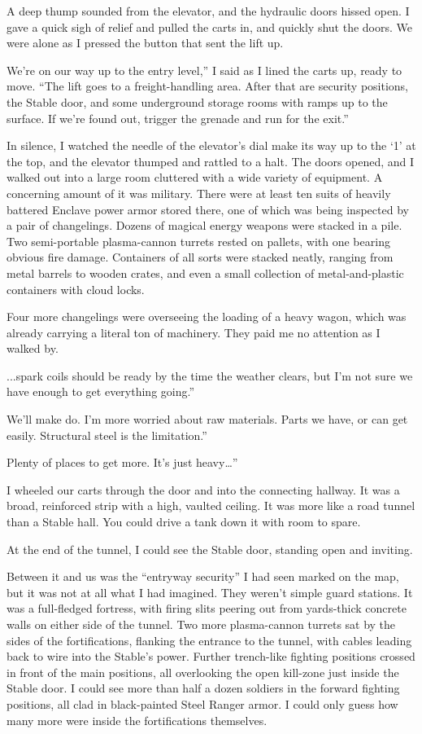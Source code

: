 A deep thump sounded from the elevator, and the hydraulic doors hissed open. I gave a quick sigh of relief and pulled the carts in, and quickly shut the doors. We were alone as I pressed the button that sent the lift up.

\leavevmode{}We’re on our way up to the entry level,” I said as I lined the carts up, ready to move. “The lift goes to a freight-handling area. After that are security positions, the Stable door, and some underground storage rooms with ramps up to the surface. If we’re found out, trigger the grenade and run for the exit.”

In silence, I watched the needle of the elevator’s dial make its way up to the ‘1’ at the top, and the elevator thumped and rattled to a halt. The doors opened, and I walked out into a large room cluttered with a wide variety of equipment. A concerning amount of it was military. There were at least ten suits of heavily battered Enclave power armor stored there, one of which was being inspected by a pair of changelings. Dozens of magical energy weapons were stacked in a pile. Two semi-portable plasma-cannon turrets rested on pallets, with one bearing obvious fire damage. Containers of all sorts were stacked neatly, ranging from metal barrels to wooden crates, and even a small collection of metal-and-plastic containers with cloud locks.

Four more changelings were overseeing the loading of a heavy wagon, which was already carrying a literal ton of machinery. They paid me no attention as I walked by.

\leavevmode{}...spark coils should be ready by the time the weather clears, but I’m not sure we have enough to get everything going.”

\leavevmode{}We’ll make do. I’m more worried about raw materials. Parts we have, or can get easily. Structural steel is the limitation.”

\leavevmode{}Plenty of places to get more. It’s just heavy…”

I wheeled our carts through the door and into the connecting hallway. It was a broad, reinforced strip with a high, vaulted ceiling. It was more like a road tunnel than a Stable hall. You could drive a tank down it with room to spare.

At the end of the tunnel, I could see the Stable door, standing open and inviting.

Between it and us was the “entryway security” I had seen marked on the map, but it was not at all what I had imagined. They weren’t simple guard stations. It was a full-fledged fortress, with firing slits peering out from yards-thick concrete walls on either side of the tunnel. Two more plasma-cannon turrets sat by the sides of the fortifications, flanking the entrance to the tunnel, with cables leading back to wire into the Stable’s power. Further trench-like fighting positions crossed in front of the main positions, all overlooking the open kill-zone just inside the Stable door. I could see more than half a dozen soldiers in the forward fighting positions, all clad in black-painted Steel Ranger armor. I could only guess how many more were inside the fortifications themselves.


